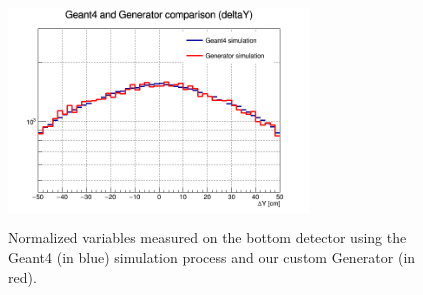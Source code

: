 \documentclass[a4paper, 11pt]{report}
\begin{document}
\begin{figure}[htbp]
{\begin{minipage}[b]{.49\textwidth}
\end{minipage}\hfill
\begin{minipage}[b]{.49\textwidth}
\includegraphics[width=8cm, height=6cm]{figs/deltaY-17p2vs17p2.png}
\end{minipage} \hfill
}
\caption{Normalized variables measured on the bottom detector using the Geant4 (in blue) simulation process and our custom Generator (in red).}
\label{fig:genComp}
\end{figure}
\end{document}
